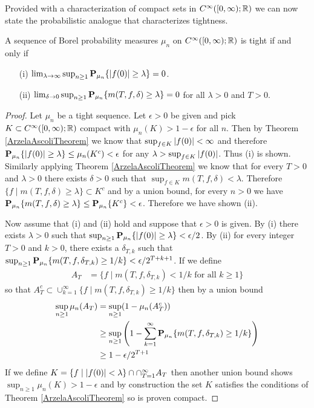 Provided with a characterization of compact sets in
$C^\infty([0,\infty); \reals)$ we can now state the probabilistic
analogue that characterizes tightness.
\begin{lem}\label{TightnessOfContinuousFunctions}A sequence of Borel probability measures $\mu_n$ on $C^\infty([0,\infty);
  \reals)$ is tight if and only if 
\begin{itemize}
\item[(i)]$\lim_{\lambda \to \infty} \sup_{n \geq 1} \sprobability{\abs{f(0)}
  \geq \lambda}{\mu_n} = 0$.
\item[(ii)] $\lim_{\delta \to 0} \sup_{n \geq 1} \sprobability{m(T, f,
  \delta) \geq \lambda}{\mu_n} = 0$ for all $\lambda > 0$ and $T > 0$.
\end{itemize}
\end{lem}
\begin{proof}
Let $\mu_n$ be a tight sequence.  Let $\epsilon > 0$ be given and pick
$K \subset C^\infty([0,\infty); \reals)$ compact with $\mu_n(K) >
1-\epsilon$ for all $n$.  Then by Theorem \ref{ArzelaAscoliTheorem} we know that $\sup_{f \in K}
\abs{f(0)} < \infty$ and therefore $\sprobability{\abs{f(0)}\geq
\lambda}{\mu_n} \leq \mu_n(K^c) < \epsilon$ for any $\lambda > \sup_{f
\in K} \abs{f(0)}$.  Thus (i) is shown.  Similarly applying Theorem \ref{ArzelaAscoliTheorem} we know that for
every $T > 0$ and $\lambda>0$
there exists $\delta>0$ such that $\sup_{f \in K} m(T, f, \delta) <
\lambda$.  Therefore $\lbrace f \mid m(T,f,\delta) \geq \lambda \rbrace
\subset K^c$ and by a union bound, for every $n>0$ we have $\sprobability{m(T,f,\delta) \geq
  \lambda}{\mu_n} \leq \sprobability{K^c}{\mu_n} < \epsilon$.
Therefore we have shown (ii).

Now assume that (i) and (ii) hold and suppose that $\epsilon > 0$ is
given.  By (i) there exists $\lambda > 0$ such that $\sup_{n \geq 1}
\sprobability{\abs{f(0)} \geq \lambda}{\mu_n} < \epsilon/2$.  By (ii)
for every integer $T > 0$ and $k > 0$, there exists a $\delta_{T,k}$
such that $\sup_{n \geq 1} \sprobability{m(T, f, \delta_{T,k}) \geq
  1/k}{\mu_n} < \epsilon/2^{T+k+1}$.  If we define 
\begin{align*}
A_T &= \lbrace f \mid 
m(T,f,\delta_{T,k}) < 1/k \text{ for all } k \geq 1\rbrace
\end{align*}
so that $A^c_T \subset \cup_{k=1}^\infty \lbrace f \mid m(T, f, \delta_{T,k}) \geq
  1/k \rbrace$ then by a union bound
\begin{align*}
\sup_{n \geq 1} \mu_n(A_T) &= \sup_{n \geq 1} (1 - \mu_n(A^c_T))\\
&\geq \sup_{n \geq 1} \left(1 - \sum_{k=1}^\infty \sprobability{m(T, f, \delta_{T,k}) \geq
  1/k}{\mu_n}\right ) \\
&\geq 1 - \epsilon/2^{T+1}
\end{align*}
If we define $K = \lbrace f \mid \abs{f(0)} < \lambda \rbrace \cap
\cap_{T=1}^\infty A_T$ then another union bound shows $\sup_{n \geq 1}
\mu_n(K) > 1 - \epsilon$ and by construction the set $K$ satisfies the
conditions of Theorem \ref{ArzelaAscoliTheorem} so is proven compact.  
\end{proof}

